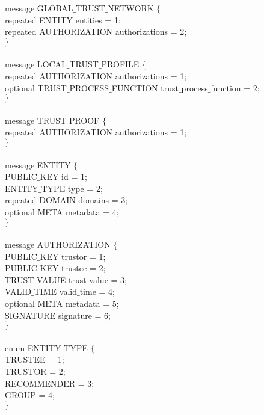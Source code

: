 \documentclass{article}
\begin{document}
message GLOBAL$\_$TRUST$\_$NETWORK $\{$\\
\hspace*{2.ex} repeated ENTITY entities = 1;\\
\hspace*{2.ex} repeated AUTHORIZATION authorizations = 2;\\
$\}$\\
\\
message LOCAL$\_$TRUST$\_$PROFILE $\{$\\
\hspace*{2.ex} repeated AUTHORIZATION authorizations = 1;\\
\hspace*{2.ex} optional TRUST$\_$PROCESS$\_$FUNCTION trust$\_$process$\_$function = 2;\\
$\}$\\
\\
message TRUST$\_$PROOF $\{$\\
\hspace*{2.ex} repeated AUTHORIZATION authorizations = 1;\\
$\}$\\
\\
message ENTITY $\{$\\
\hspace*{2.ex} PUBLIC$\_$KEY id = 1;\\
\hspace*{2.ex} ENTITY$\_$TYPE type = 2;\\
\hspace*{2.ex} repeated DOMAIN domains = 3;\\
\hspace*{2.ex} optional META metadata = 4;\\
$\}$\\
\\
message AUTHORIZATION $\{$\\
\hspace*{2.ex} PUBLIC$\_$KEY trustor = 1;\\
\hspace*{2.ex} PUBLIC$\_$KEY trustee = 2;\\
\hspace*{2.ex} TRUST$\_$VALUE trust$\_$value = 3;\\
\hspace*{2.ex} VALID$\_$TIME valid$\_$time = 4;\\
\hspace*{2.ex} optional META metadata = 5;\\
\hspace*{2.ex} SIGNATURE signature = 6;\\
$\}$\\
\\
enum ENTITY$\_$TYPE $\{$\\
\hspace*{2.ex} TRUSTEE = 1;\\
\hspace*{2.ex} TRUSTOR = 2;\\
\hspace*{2.ex} RECOMMENDER = 3;\\
\hspace*{2.ex} GROUP = 4;\\
$\}$
\end{document}
